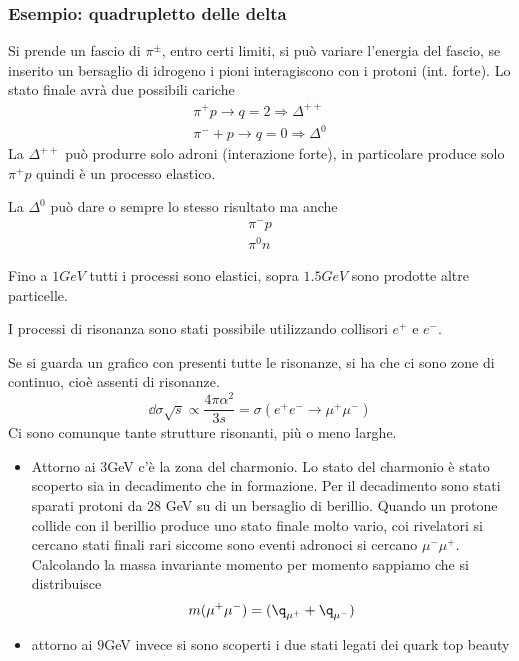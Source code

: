 \documentclass[12pt]{book}
\begin{document}
\subsubsection{Esempio: quadrupletto delle delta}
Si prende un fascio di $\pi^\pm$, entro certi limiti, si può variare l'energia del fascio, se inserito un bersaglio di idrogeno i pioni interagiscono con i protoni (int. forte). Lo stato finale avrà due possibili cariche
\begin{gather}
	\pi^+ p \rightarrow q=2 \Rightarrow \Delta^{++}\\
	\pi^- + p \rightarrow q=0 \Rightarrow \Delta^0
\end{gather}
La $\Delta^{++}$ può produrre solo adroni (interazione forte), in particolare produce solo $\pi^+ p$ quindi è un processo elastico. 

La $\Delta^{0}$ può dare o sempre lo stesso risultato ma anche 
\begin{gather}
	\pi^- p \\
	\pi^0 n
\end{gather}

Fino a $1GeV$ tutti i processi sono elastici, sopra $1.5 GeV$ sono prodotte altre particelle.




I processi di risonanza sono stati possibile utilizzando collisori $e^+$ e $e^-$.

Se si guarda un grafico con presenti tutte le risonanze, si ha che ci sono zone di continuo, cioè assenti di risonanze.
\begin{equation}
	\dd{\sigma}{\sqrt{s}} \propto \frac{4 \pi \alpha^2}{3s} = \sigma(e^+e^- \rightarrow \mu^+ \mu^-)
\end{equation}
Ci sono comunque tante strutture risonanti, più o meno larghe. 
\begin{itemize}
	\item Attorno ai 3GeV c'è la zona del charmonio. Lo stato del charmonio è stato scoperto sia in decadimento che in formazione. Per il decadimento sono stati sparati protoni da 28 GeV su di un bersaglio di berillio. Quando un protone collide con il berillio produce uno stato finale molto vario, coi rivelatori si cercano stati finali rari siccome sono eventi adronoci si cercano $\mu^- \mu^+$. Calcolando la massa invariante momento per momento sappiamo che si distribuisce 
	\begin{equation}
		m (\mu^+ \mu^-) = ( \q_{\mu^+} + \q_{\mu^-})	
	\end{equation}
	
	\item attorno ai $9$GeV invece si sono scoperti i due stati legati dei quark top beauty
\end{itemize}
\end{document}
